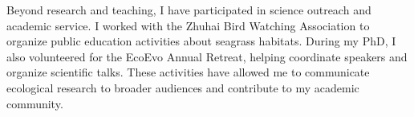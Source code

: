 \documentclass[12pt]{article}
\begin{document}
Beyond research and teaching, I have participated in science outreach and academic service. I worked with the Zhuhai Bird Watching Association to organize public education activities about seagrass habitats. During my PhD, I also volunteered for the EcoEvo Annual Retreat, helping coordinate speakers and organize scientific talks. These activities have allowed me to communicate ecological research to broader audiences and contribute to my academic community.
\end{document}
